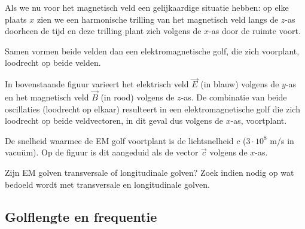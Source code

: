 

 Als we nu voor het magnetisch veld een gelijkaardige situatie hebben: op elke plaats $x$ zien we een harmonische trilling van het magnetisch veld langs de $z$-as doorheen de tijd en deze trilling plant zich volgens de $x$-as door de ruimte voort.

 Samen vormen beide velden dan een elektromagnetische golf, die zich voorplant, loodrecht op beide velden. 

 \begin{center}
 
 \end{center}
 
  In bovenstaande figuur varieert het elektrisch veld $\vec{E}$ (in blauw) volgens de $y$-as en het magnetisch veld $\vec{B}$ (in rood) volgens de $z$-as. De combinatie van beide oscillaties (loodrecht op elkaar) resulteert in een elektromagnetische golf die zich loodrecht op beide veldvectoren, in dit geval dus volgens de $x$-as, voortplant.
 
  De snelheid waarmee de EM golf voortplant is de lichtsnelheid $c$ ($3 \cdot 10^8$ m/s in vacu\"um). Op de figuur is dit aangeduid als de vector $\vec{c}$ volgens de $x$-as.

 \begin{oef}
 Zijn EM golven transversale of longitudinale golven? Zoek indien nodig op wat bedoeld wordt met transversale en longitudinale golven.
 \end{oef}

 \subsection{Golflengte en frequentie}

